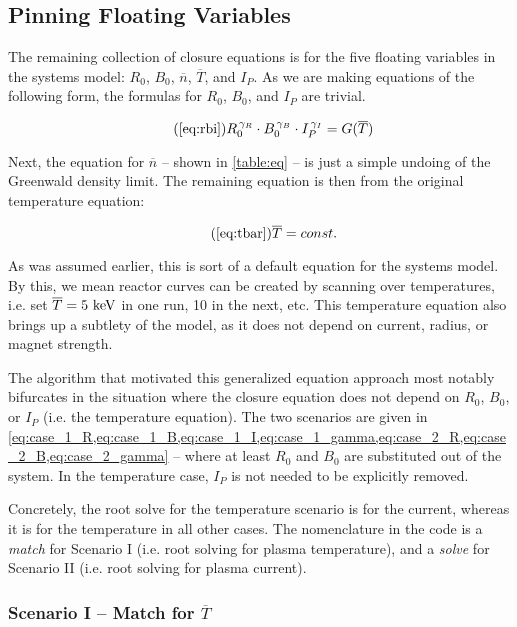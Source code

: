 \subsection{Pinning Floating Variables} 

The remaining collection of closure equations is for the five floating variables in the systems model: $R_0$, $B_0$, $\overline n$, $\overline T$, and $I_P$. As we are making equations of the following form, the formulas for $R_0$, $B_0$, and $I_P$ are trivial.

\begin{equation}
	\tag{\ref{eq:rbi}}
	R_0^{\, \gamma_R} \cdot B_0^{\, \gamma_B} \cdot I_P^{\, \gamma_I} = G( \overline T )
\end{equation}

Next, the equation for $\overline n$ -- shown in \cref{table:eq} -- is just a simple undoing of the Greenwald density limit. The remaining equation is then from the original temperature equation:

\begin{equation}
	\tag{\ref{eq:tbar}}
	\overline T = const.
\end{equation}

As was assumed earlier, this is sort of a default equation for the systems model. By this, we mean reactor curves can be created by scanning over temperatures, i.e. set $\overline T = 5 \ \textnormal{keV}$ in one run, 10 in the next, etc. This temperature equation also brings up a subtlety of the model, as it does not depend on current, radius, or magnet strength.

The algorithm that motivated this generalized equation approach most notably bifurcates in the situation where the closure equation does not depend on $R_0$, $B_0$, or $I_P$ (i.e. the temperature equation). The two scenarios are given in \cref{eq:case_1_R,eq:case_1_B,eq:case_1_I,eq:case_1_gamma,eq:case_2_R,eq:case_2_B,eq:case_2_gamma} -- where at least $R_0$ and $B_0$ are substituted out of the system. In the temperature case, $I_P$ is not needed to be explicitly removed. 

Concretely, the root solve for the temperature  scenario is for the current, whereas it is for the temperature in all other cases. The nomenclature in the code is a \emph{match} for Scenario I (i.e. root solving for plasma temperature), and a \emph{solve} for Scenario II (i.e. root solving for plasma current).

\subsubsection{Scenario I -- Match for $\overline T$}

